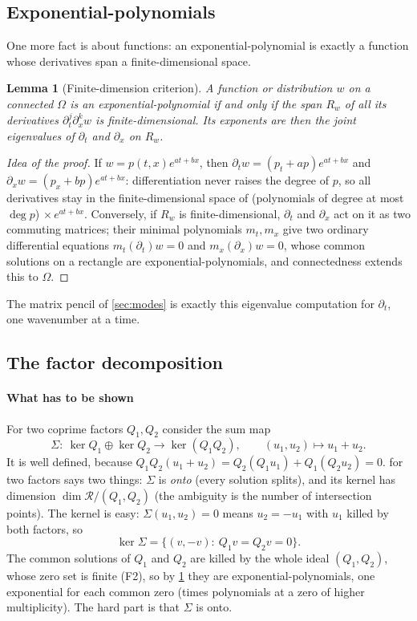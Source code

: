\documentclass[11pt]{article}
\theoremstyle{plain}
\newtheorem{lemma}[theorem]{Lemma}
\theoremstyle{definition}
\theoremstyle{remark}
\newcommand{\ring}{\mathcal{R}}            %
\begin{document}
\subsection{Exponential-polynomials}\label{sm:ep}
One more fact is about functions: an exponential-polynomial is exactly a function whose derivatives span a
finite-dimensional space.
\begin{lemma}[Finite-dimension criterion]\label{sm:lem:ep}
A function or distribution $w$ on a connected $\Omega$ is an exponential-polynomial if and only if the span $R_w$ of all
its derivatives $\partial_t^j\partial_x^kw$ is finite-dimensional. Its exponents are then the joint eigenvalues of
$\partial_t$ and $\partial_x$ on $R_w$.
\end{lemma}
\begin{proof}[Idea of the proof]
If $w=p(t,x)e^{at+bx}$, then $\partial_tw=(p_t+ap)e^{at+bx}$ and $\partial_xw=(p_x+bp)e^{at+bx}$: differentiation never
raises the degree of $p$, so all derivatives stay in the finite-dimensional space of (polynomials of degree at most
$\deg p$)$\,\times e^{at+bx}$. Conversely, if $R_w$ is finite-dimensional, $\partial_t$ and $\partial_x$ act on it as two
commuting matrices; their minimal polynomials $m_t,m_x$ give two ordinary differential equations $m_t(\partial_t)w=0$
and $m_x(\partial_x)w=0$, whose common solutions on a rectangle are exponential-polynomials, and connectedness extends
this to $\Omega$.
\end{proof}
The matrix pencil of \cref{sec:modes} is exactly this eigenvalue computation for $\partial_t$, one wavenumber at a time.

\subsection{The factor decomposition}\label{sm:proof-factor}
\paragraph{What has to be shown} For two coprime factors $Q_1,Q_2$ consider the sum map
\[
  \Sigma:\ \ker Q_1\oplus\ker Q_2\to\ker(Q_1Q_2),\qquad (u_1,u_2)\mapsto u_1+u_2 .
\]
It is well defined, because $Q_1Q_2(u_1+u_2)=Q_2(Q_1u_1)+Q_1(Q_2u_2)=0$.  for two factors says two
things: $\Sigma$ is \emph{onto} (every solution splits), and its kernel has dimension $\dim\ring/(Q_1,Q_2)$ (the
ambiguity is the number of intersection points). The kernel is easy: $\Sigma(u_1,u_2)=0$ means $u_2=-u_1$ with $u_1$
killed by both factors, so
\[
  \ker\Sigma=\{(v,-v):\ Q_1v=Q_2v=0\}.
\]
The common solutions of $Q_1$ and $Q_2$ are killed by the whole ideal $(Q_1,Q_2)$, whose zero set is finite (F2), so by
\cref{sm:lem:ep} they are exponential-polynomials, one exponential for each common zero (times polynomials at a zero of
higher multiplicity). The hard part is that $\Sigma$ is onto.
\end{document}
